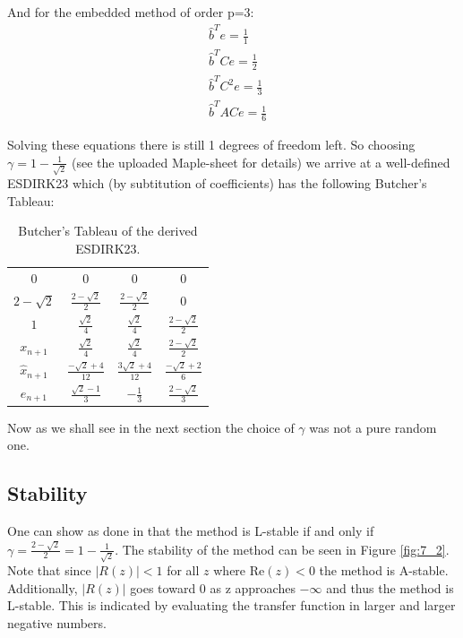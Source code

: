 And for the embedded method of order p=3:
\begin{align*}
    & \hat{b}^T e = \frac{1}{1} \\
    & \hat{b}^T C e = \frac{1}{2} \\
    & \hat{b}^T C^2 e = \frac{1}{3} \\
    & \hat{b}^T A C e = \frac{1}{6}
\end{align*}

Solving these equations there is still 1 degrees of freedom left. So choosing $\gamma=1-\frac{1}{\sqrt{2}}$ (see the uploaded Maple-sheet for details) we arrive at a well-defined ESDIRK23 which (by subtitution of coefficients) has the following Butcher's Tableau:

\begin{table}[H]
\centering
\begin{tabular}{c|ccc}
0 & 0 & 0 & 0 \\
$2-\sqrt{2}$ & $\frac{2-\sqrt{2}}{2}$  & $\frac{2-\sqrt{2}}{2}$ & 0 \\
$1$ & $\frac{\sqrt{2}}{4}$ & $\frac{\sqrt{2}}{4}$ & $\frac{2-\sqrt{2}}{2}$ \\ \hline
$x_{n+1}$ & $\frac{\sqrt{2}}{4}$ & $\frac{\sqrt{2}}{4}$ & $\frac{2-\sqrt{2}}{2}$ \\
$\hat{x}_{n+1}$ & $\frac{-\sqrt{2}+4}{12}$ & $\frac{3\sqrt{2}+4}{12}$ & $\frac{-\sqrt{2}+2}{6} $ \\ \hline
$e_{n+1}$ & $\frac{\sqrt{2}-1}{3}$ & $-\frac{1}{3}$ & $\frac{2-\sqrt{2}}{3}$
\end{tabular}
\caption{Butcher's Tableau of the derived ESDIRK23.}
\end{table}


Now as we shall see in the next section the choice of $\gamma$ was not a pure random one.

\subsection{Stability}
One can show as done in \cite{JrgensenRunge-KuttaControl} that the method is L-stable if and only if $\gamma = \frac{2-\sqrt{2}}{2} =1-\frac{1}{\sqrt{2}}$. The stability of the method can be seen in Figure \ref{fig:7_2}. Note that since $|R(z)| < 1$ for all $z$ where $\mathrm{Re}(z) < 0$ the method is A-stable. Additionally, $|R(z)|$ goes toward 0 as z approaches $-\infty$ and thus the method is L-stable. This is indicated by evaluating the transfer function in larger and larger negative numbers.

